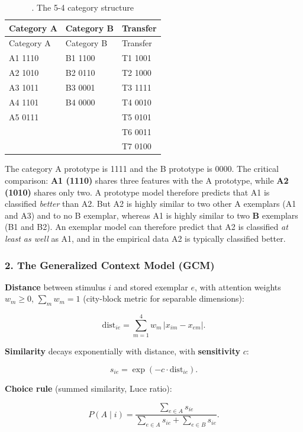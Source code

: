 \begin{longtable}[]{@{}lll@{}}
\caption{. The 5-4 category structure}\tabularnewline
\toprule\noalign{}
Category A & Category B & Transfer \\
\midrule\noalign{}
\endfirsthead
\toprule\noalign{}
Category A & Category B & Transfer \\
\midrule\noalign{}
\endhead
\bottomrule\noalign{}
\endlastfoot
A1 1110 & B1 1100 & T1 1001 \\
A2 1010 & B2 0110 & T2 1000 \\
A3 1011 & B3 0001 & T3 1111 \\
A4 1101 & B4 0000 & T4 0010 \\
A5 0111 & & T5 0101 \\
& & T6 0011 \\
& & T7 0100 \\
\end{longtable}

The category A prototype is 1111 and the B prototype is 0000. The
critical comparison: \textbf{A1 (1110)} shares three features with the A
prototype, while \textbf{A2 (1010)} shares only two. A prototype model
therefore predicts that A1 is classified \emph{better} than A2. But A2
is highly similar to two other A exemplars (A1 and A3) and to no B
exemplar, whereas A1 is highly similar to two \textbf{B} exemplars (B1
and B2). An exemplar model can therefore predict that A2 is classified
\emph{at least as well} as A1, and in the empirical data A2 is typically
classified better.

\subsubsection{2. The Generalized Context Model (GCM)}

\textbf{Distance} between stimulus \(i\) and stored exemplar \(e\), with
attention weights \(w_m \ge 0\), \(\sum_m w_m = 1\) (city-block metric
for separable dimensions):

\[
\mathrm{dist}_{ie} = \sum_{m=1}^{4} w_m\, |x_{im} - x_{em}|.
\]

\textbf{Similarity} decays exponentially with distance, with
\textbf{sensitivity} \(c\):

\[
s_{ie} = \exp(-c \cdot \mathrm{dist}_{ie}).
\]

\textbf{Choice rule} (summed similarity, Luce ratio):

\[
P(A \mid i) = \frac{\sum_{e \in A} s_{ie}}{\sum_{e \in A} s_{ie} + \sum_{e \in B} s_{ie}}.
\]

